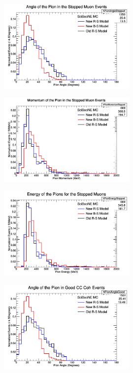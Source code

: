 \documentclass[11pt]{article}
\begin{document}
\begin{figure}[H]
\centering
\includegraphics[width=0.6\textwidth]{NMPionPlottingImages/4-NMPionPlotting.png}
\caption{}
\end{figure}

\begin{figure}[H]
\centering
\includegraphics[width=0.6\textwidth]{NMPionPlottingImages/5-NMPionPlotting.png}
\caption{}
\end{figure}

\begin{figure}[H]
\centering
\includegraphics[width=0.6\textwidth]{NMPionPlottingImages/6-NMPionPlotting.png}
\caption{}
\end{figure}

\begin{figure}[H]
\centering
\includegraphics[width=0.6\textwidth]{NMPionPlottingImages/7-NMPionPlotting.png}
\caption{}
\end{figure}
\end{document}
